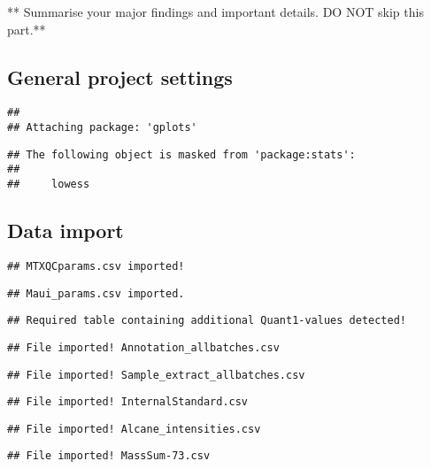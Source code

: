 \documentclass[9pt,]{article}
\begin{document}
** Summarise your major findings and important details. DO NOT skip this
part.**

\subsection{General project settings}\label{general-project-settings}

\begin{verbatim}
## 
## Attaching package: 'gplots'
\end{verbatim}

\begin{verbatim}
## The following object is masked from 'package:stats':
## 
##     lowess
\end{verbatim}

\subsection{Data import}\label{data-import}

\begin{verbatim}
## MTXQCparams.csv imported!
\end{verbatim}

\begin{verbatim}
## Maui_params.csv imported.
\end{verbatim}

\begin{verbatim}
## Required table containing additional Quant1-values detected!
\end{verbatim}

\begin{verbatim}
## File imported! Annotation_allbatches.csv
\end{verbatim}

\begin{verbatim}
## File imported! Sample_extract_allbatches.csv
\end{verbatim}

\begin{verbatim}
## File imported! InternalStandard.csv
\end{verbatim}

\begin{verbatim}
## File imported! Alcane_intensities.csv
\end{verbatim}

\begin{verbatim}
## File imported! MassSum-73.csv
\end{verbatim}
\end{document}
